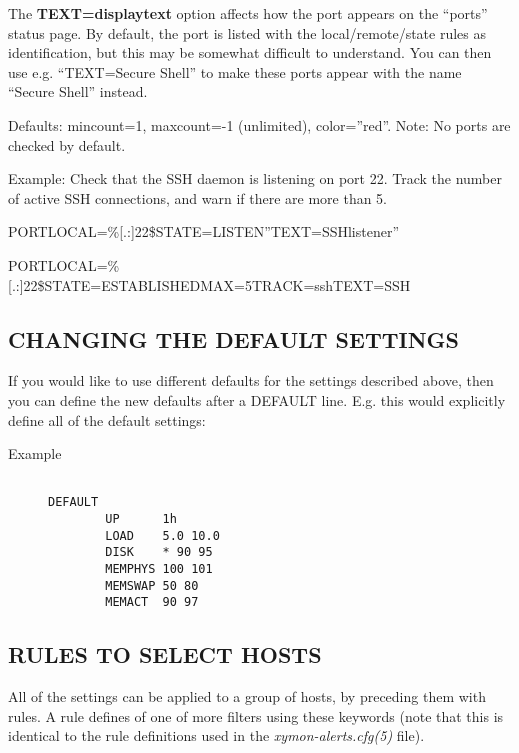   The \textbf{TEXT=displaytext}
 option affects how the port appears on the ``ports'' status page. By default, the port is listed with the local/remote/state rules as identification, but this may be somewhat difficult to understand. You can then use e.g. ``TEXT=Secure Shell'' to make these ports appear with the name ``Secure Shell'' instead. 


  Defaults: mincount=1, maxcount=-1 (unlimited), color=''red''. Note: No ports are checked by default. 


  Example: Check that the SSH daemon is listening on port 22. Track the number of active SSH connections, and warn if there are more than 5.  
 
PORTLOCAL=\%[.:]22\$STATE=LISTEN''TEXT=SSHlistener''  
 
PORTLOCAL=\%[.:]22\$STATE=ESTABLISHEDMAX=5TRACK=sshTEXT=SSH 


 
\subsection{CHANGING THE DEFAULT SETTINGS}
 If you would like to use different defaults for the settings
 described above, then you can define the new defaults after a DEFAULT
 line. E.g. this would explicitly define all of the default settings: 

\begin{description}

\item[Example]

\begin{verbatim}

DEFAULT
        UP      1h
        LOAD    5.0 10.0
        DISK    * 90 95
        MEMPHYS 100 101
        MEMSWAP 50 80
        MEMACT  90 97

\end{verbatim}


\end{description}


 


 
\subsection{RULES TO SELECT HOSTS}
 All of the settings can be applied to a group of hosts, by preceding them with rules. A rule defines of one of more filters using these keywords (note that this is identical to the rule definitions used in the \emph{xymon-alerts.cfg(5)}
 file). 


